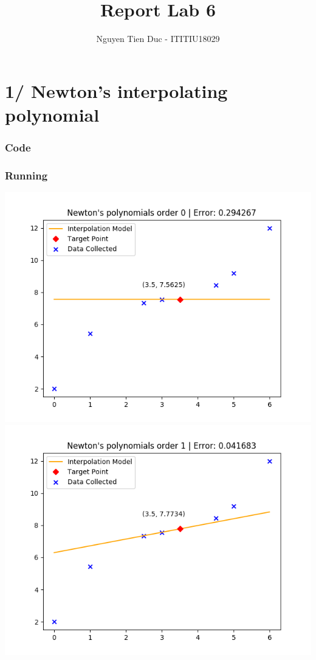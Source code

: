 \documentclass[12pt]{article}
\begin{document}
  \title{Report Lab 6}
  \author{Nguyen Tien Duc - ITITIU18029}
  \maketitle
  \part*{1/ Newton's interpolating polynomial}
    \section*{Code}
    \section*{Running}
      \begin{center}
        \includegraphics{Order0.png}
        \includegraphics{Order1.png}

\end{center}
\end{document}
